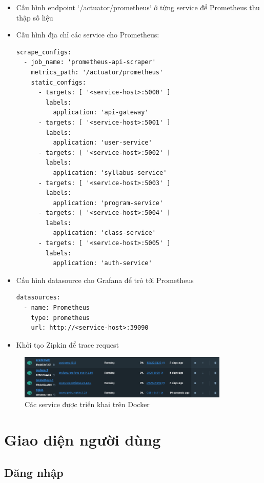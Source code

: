 \documentclass[report.tex]{subfiles}
\begin{document}
\begin{itemize}
\item Cấu hình endpoint `/actuator/prometheus` ở từng service để Prometheus thu thập số liệu
\item Cấu hình địa chỉ các service cho Prometheus:

\begin{verbatim}
scrape_configs:
  - job_name: 'prometheus-api-scraper'
    metrics_path: '/actuator/prometheus'
    static_configs:
      - targets: [ '<service-host>:5000' ]
        labels:
          application: 'api-gateway'
      - targets: [ '<service-host>:5001' ]
        labels:
          application: 'user-service'
      - targets: [ '<service-host>:5002' ]
        labels:
          application: 'syllabus-service'
      - targets: [ '<service-host>:5003' ]
        labels:
          application: 'program-service'
      - targets: [ '<service-host>:5004' ]
        labels:
          application: 'class-service'
      - targets: [ '<service-host>:5005' ]
        labels:
          application: 'auth-service'
\end{verbatim}
\item Cấu hình datasource cho Grafana để trỏ tới Prometheus
\begin{verbatim}
datasources:
  - name: Prometheus
    type: prometheus
    url: http://<service-host>:39090
\end{verbatim}
\item Khởi tạo Zipkin để trace request
\end{itemize}

\begin{figure}[!htb]
{\centering
\includegraphics[width=380px]{../meta/ui.docker-compose.png}
\caption{Các service được triển khai trên Docker}
\par
}
\end{figure}
\FloatBarrier

\section{Giao diện người dùng}

\subsection{Đăng nhập}
\end{document}
